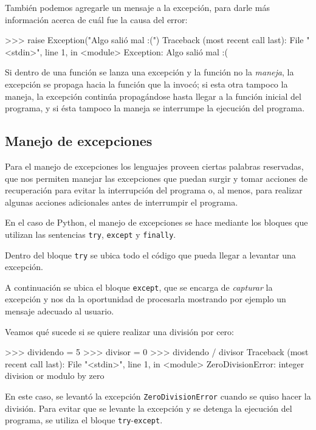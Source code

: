 También podemos agregarle un mensaje a la excepción, para darle más información
acerca de cuál fue la causa del error:

\begin{codigo-python-sn}
>>> raise Exception("Algo salió mal :(")
Traceback (most recent call last):
  File "<stdin>", line 1, in <module>
Exception: Algo salió mal :(
\end{codigo-python-sn}

Si dentro de una función se lanza una excepción y la función no la {\it
maneja}, la excepción se propaga hacia la función que la invocó; si esta otra
tampoco la maneja, la excepción continúa propagándose hasta llegar a la función
inicial del programa, y si ésta tampoco la maneja se interrumpe la ejecución
del programa.

\subsection{Manejo de excepciones}

Para el manejo de excepciones los lenguajes proveen ciertas palabras
reservadas, que nos permiten manejar las excepciones que puedan surgir y
tomar acciones de recuperación para evitar la interrupción del programa o,
al menos, para realizar algunas acciones adicionales antes de interrumpir
el programa.

En el caso de Python, el manejo de excepciones se hace mediante los
bloques que utilizan las sentencias \lstinline!try!, \lstinline!except! y
\lstinline!finally!.

Dentro del bloque \lstinline!try! se ubica todo el código que pueda llegar
a levantar una excepción.

A continuación se ubica el bloque \lstinline!except!, que se encarga de {\it
capturar} la excepción y nos da la oportunidad de procesarla mostrando por
ejemplo un mensaje adecuado al usuario.

Veamos qué sucede si se quiere realizar una división por cero:

\begin{codigo-python-sn}
>>> dividendo = 5
>>> divisor = 0
>>> dividendo / divisor
Traceback (most recent call last):
  File "<stdin>", line 1, in <module>
ZeroDivisionError: integer division or modulo by zero
\end{codigo-python-sn}

En este caso, se levantó la excepción \lstinline!ZeroDivisionError! cuando se
quiso hacer la división.  Para evitar que se levante la excepción y se detenga
la ejecución del programa, se utiliza el bloque
\lstinline!try!-\lstinline!except!.

